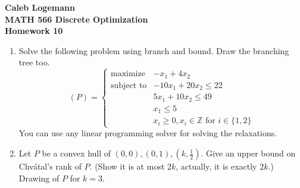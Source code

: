 \documentclass[11pt, oneside]{article}
\begin{document}
\noindent \textbf{\Large{Caleb Logemann \\
MATH 566 Discrete Optimization\\
Homework 10
}}

%
\begin{enumerate}
  \item %
    Solve the following problem using branch and bound.
    Draw the branching tree too.
    \[
      (P)=
      \begin{cases}
        \text{maximize} & -x_1 + 4x_2\\
        \text{subject to} & -10x_1 + 20x_2 \leq 22 \\
                          &   5x_1 +10x_2 \leq 49 \\
                          &  x_1 \leq 5\\
                          & x_i \geq 0,  x_i \in \mathbb{Z} \text{ for } i \in \{1,2\}
      \end{cases}
    \]
    You can use any linear programming solver for solving the relaxations.

  \item %
    Let $P$ be a convex hull of $(0,0), (0,1), (k,\frac{1}{2})$.
    Give an upper bound on Chv\'atal's rank of $P$.
    (Show it is at most $2k$, actually, it is exactly $2k$.)\\
    Drawing of $P$ for $k=3$.
    \begin{center}
    \end{center}


\end{enumerate}
\end{document}
